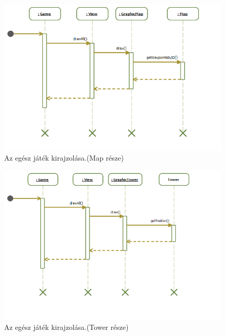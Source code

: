 \begin{figure}[H]
\begin{center}
\includegraphics[width=18cm]{images/grafikaSeq/step1.png}
\caption{Az egész játék kirajzolása.(Map része)}
\label{fig:Graphic_drawAll_Map}
\end{center}
\end{figure}

\begin{figure}[H]
\begin{center}
\includegraphics[width=18cm]{images/grafikaSeq/step2.png}
\caption{Az egész játék kirajzolása.(Tower része)}
\label{fig:Graphic_drawAll_Tower}
\end{center}
\end{figure}

